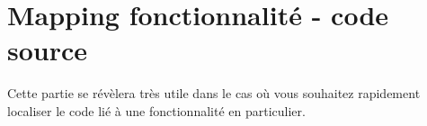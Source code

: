 \chapter{Mapping fonctionnalité - code source}

Cette partie se révèlera très utile dans le cas où vous souhaitez rapidement localiser le code lié à une fonctionnalité en particulier.

